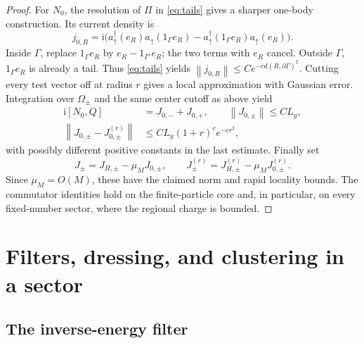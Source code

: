 \documentclass[11pt]{article}
\theoremstyle{definition}
\theoremstyle{remark}
\newcommand{\ii}{\mathrm i}
\newcommand{\up}{\uparrow}
\newcommand{\norm}[1]{\left\lVert#1\right\rVert}
\begin{document}
\begin{proof}
For \(N_0\), the resolution of \(\Pi\) in \eqref{eq:tails}
gives a sharper one-body construction.  Its current density is
\[
 j_{0,R}=\ii\bigl(
 a_\up^\dagger(e_R)a_\up(1_\Gamma e_R)
 -a_\up^\dagger(1_\Gamma e_R)a_\up(e_R)\bigr).
\]
Inside \(\Gamma\), replace \(1_\Gamma e_R\) by
\(e_R-1_{\Gamma^c}e_R\); the two terms with \(e_R\) cancel.
Outside \(\Gamma\), \(1_\Gamma e_R\) is already a tail.
Thus \eqref{eq:tails} yields
\(\norm{j_{0,R}}\le Ce^{-c d(R,\partial\Gamma)^2}\).
Cutting every test vector off at radius \(r\) gives a local
approximation with Gaussian error.  Integration over \(\Omega_\pm\)
and the same center cutoff as above yield
\begin{align*}
 \ii[N_0,Q]&=J_{0,-}+J_{0,+},\qquad
 \norm{J_{0,\pm}}\le CL_y,\\
 \norm{J_{0,\pm}-J_{0,\pm}^{(r)}}
       &\le CL_y(1+r)^c e^{-cr^2},
\end{align*}
with possibly different positive constants in the last estimate.
Finally set
\[
 J_\pm=J_{H,\pm}-\mu_MJ_{0,\pm},\qquad
 J_\pm^{(r)}=J_{H,\pm}^{(r)}-\mu_MJ_{0,\pm}^{(r)}.
\]
Since \(\mu_M=O(M)\), these have the claimed norm and rapid
locality bounds.  The commutator identities hold on the
finite-particle core and, in particular, on every fixed-number
sector, where the regional charge is bounded.
\end{proof}

\section{Filters, dressing, and clustering in a sector}\label{app:filters}

\subsection{The inverse-energy filter}
\end{document}

